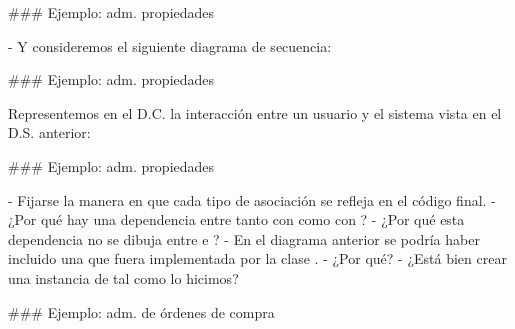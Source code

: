 ### Ejemplo: adm. propiedades


- Y consideremos el siguiente diagrama de secuencia:


### Ejemplo: adm. propiedades


Representemos en el D.C. la interacción entre un usuario y el sistema vista en el D.S. anterior:

\tikzinlinec[0.45]{%
    \exAdmPropsInteraction
}

### Ejemplo: adm. propiedades


- Fijarse la manera en que cada tipo de asociación se refleja en el código final.
- ¿Por qué hay una dependencia entre  tanto con  como
con ?
    - ¿Por qué esta dependencia no se dibuja entre  e ?
- En el diagrama anterior se podría haber incluido una  que fuera implementada
por la clase .
    - ¿Por qué?
- ¿Está bien crear una instancia de  tal como lo hicimos?

### Ejemplo: adm. de órdenes de compra


